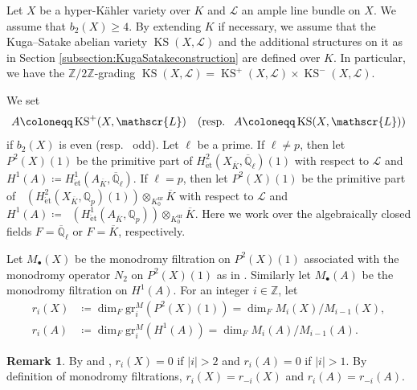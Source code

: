 \documentclass[12pt,reqno]{amsart}
\theoremstyle{definition}
\newtheorem{rem}[thm]{Remark}
\newcommand{\Q}{{\mathds Q}}
\newcommand{\Z}{{\mathds Z}}
\DeclareMathOperator{\Dpst}{\mathit{D}_{\mathrm{pst}}}
\newcommand\KS{\mathop{\mathrm{KS}}\nolimits}
\newcommand{\et}{\mathrm{\acute{e}t}}
\newcommand{\scrL}{\mathscr{L}}
\DeclareMathOperator{\ur}{ur}
\numberwithin{equation}{section}
\begin{document}
Let $X$ be a hyper-Kähler variety over $K$
and $\scrL$ an ample line bundle on $X$.
We assume that $b_{2} (X) \geq 4$.
By extending $K$ if necessary, we assume that the Kuga--Satake abelian variety $\KS(X,\scrL)$ and the additional structures on it as in Section \ref{subsection:KugaSatakeconstruction} are defined over $K$.
In particular, we have
the $\Z/2\Z$-grading
$\KS(X,\scrL)=\KS^+(X,\scrL) \times \KS^-(X,\scrL)$.


We set
\[
A\coloneqq \KS^+(X,\scrL) \quad \textup{(resp.~ } A\coloneqq \KS(X,\scrL))
\]
if $b_2 (X)$ is even (resp.~ odd).
Let $\ell$ be a prime.
If $\ell \neq p$, then let
$P^2(X)(1)$ be the primitive part of $H^2_{\et}(X_{\overline{K}}, \overline{\Q}_\ell)(1)$
with respect to $\mathscr{L}$
and
$H^1(A)\coloneqq H^1_{\et}(A_{\overline{K}}, \overline{\Q}_\ell)$.
If $\ell=p$, then
let
$P^2(X)(1)$ be the primitive part of 
$\Dpst(H_{\et}^{2}(X_{\overline{K}},\Q_{p})(1)) \otimes_{K^{\ur}_0} \overline{K}$
with respect to $\mathscr{L}$
and 
$H^1(A)\coloneqq \Dpst(H^1_{\et}(A_{\overline{K}}, \Q_p)) \otimes_{K^{\ur}_0} \overline{K}$.
Here we work over the algebraically closed fields
$F=\overline{\Q}_\ell$
or $F=\overline{K}$, respectively.

Let 
$M_\bullet(X)$ be the monodromy filtration on 
$P^2(X)(1)$
associated with the monodromy operator $N_2$ on $P^2(X)(1)$
as in \cite[Proposition 1.6.1]{WeilII}.
Similarly let
$M_\bullet(A)$
be the monodromy filtration on 
$H^1(A)$.
For an integer $i \in \Z$, let
\begin{align*}
    r_{i}(X) &\coloneqq  \dim_F \mathrm{gr}^M_i(P^2(X)(1)) = \dim_F M_{i}(X)/M_{i-1}(X), \\
    r_{i}(A) &\coloneqq  \dim_F \mathrm{gr}^M_i(H^1(A)) = \dim_F M_{i}(A)/M_{i-1}(A).
\end{align*}

\begin{rem}\label{Remark:range and symmetry}
By  and ,
$r_{i}(X)=0$ if $\vert i \vert > 2$ and $r_{i}(A)=0$ if $\vert i \vert > 1$.
By definition of monodromy filtrations, $r_{i}(X)=r_{-i}(X)$ and $r_{i}(A)=r_{-i}(A)$.
\end{rem}
\end{document}
